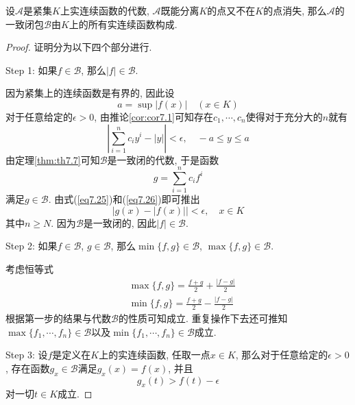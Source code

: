 \documentclass[cn,12pt,math=mtpro2,citestyle=gb7714-2015,bibstyle=gb7714-2015,twocol]{elegantbook}
\begin{document}
\begin{theorem}
  设$\mathscr{A}$是紧集$K$上实连续函数的代数, $\mathscr{A}$既能分离$K$的点又不在$K$的点消失, 那么$\mathscr{A}$的一致闭包$\mathscr{B}$由$K$上的所有实连续函数构成.
\end{theorem}
\begin{proof}
  证明分为以下四个部分进行.

  \textcolor[rgb]{0.96,0.53,0.14}{Step 1: 如果$f\in\mathscr{B}$, 那么$|f|\in\mathscr{B}$.}

  因为紧集上的连续函数是有界的, 因此设
  \begin{equation}\label{eq7.25}
    a=\sup |f(x)| \quad (x\in K)
  \end{equation}
  对于任意给定的$\epsilon>0$, 由推论\ref{cor:cor7.1}可知存在$c_1,\cdots,c_n$使得对于充分大的$n$就有
  \begin{equation}\label{eq7.26}
   \left|\sum_{i=1}^{n}c_iy^i-|y|\right|<\epsilon, \quad -a\leq y\leq a
  \end{equation}
  由定理\ref{thm:th7.7}可知$\mathscr{B}$是一致闭的代数, 于是函数
  $$g=\sum_{i=1}^{n}c_if^i$$
  满足$g\in\mathscr{B}$. 由式(\ref{eq7.25})和(\ref{eq7.26})即可推出
  $$|g(x)-|f(x)||<\epsilon, \quad x\in K$$
  其中$n\geq N$. 因为$\mathscr{B}$是一致闭的, 因此$|f|\in\mathscr{B}$.

    \textcolor[rgb]{0.96,0.53,0.14}{Step 2: 如果$f\in\mathscr{B}$, $g\in\mathscr{B}$, 那么$\min\{f,g\}\in\mathscr{B}$, $\max\{f,g\}\in\mathscr{B}$.}

    考虑恒等式
    \begin{align*}
    &\max\{f,g\}=\frac{f+g}{2}+\frac{|f-g|}{2} \\
    &\min\{f,g\}=\frac{f+g}{2}-\frac{|f-g|}{2}
    \end{align*}
    根据第一步的结果与代数$\mathscr{B}$的性质可知成立. 重复操作下去还可推知$\max\{f_1,\cdots,f_n\}\in\mathscr{B}$以及$\min\{f_1,\cdots,f_n\}\in\mathscr{B}$成立.

     \textcolor[rgb]{0.96,0.53,0.14}{Step 3: 设$f$是定义在$K$上的实连续函数, 任取一点$x\in K$, 那么对于任意给定的$\epsilon>0$, 存在函数$g_x\in\mathscr{B}$满足$g_x(x)=f(x)$, 并且\begin{equation}\label{eq7.27}
       g_x(t)>f(t)-\epsilon
     \end{equation}
     对一切$t\in K$成立.}


\end{proof}
\end{document}
